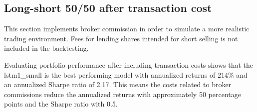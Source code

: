 \subsection{Long-short 50/50 after transaction cost}
This section implements broker commission in order to simulate a more realistic trading environment. Fees for lending shares intended for short selling is not included in the backtesting. 
\indent\newline 
\begin{table}[ht]
\centering
{}
\caption{50/50 long-short small cap w/t.cost (2K, K=2)}
\end{table}
\indent\newline 
Evaluating portfolio performance after including transaction costs shows that the lstm1\_small is the best performing model with annualized returns of 214\% and an annualized Sharpe ratio of 2.17. This means the costs related to broker commissions reduce the annualized returns with approximately 50 percentage points and the Sharpe ratio with 0.5. 
\indent\newline 
